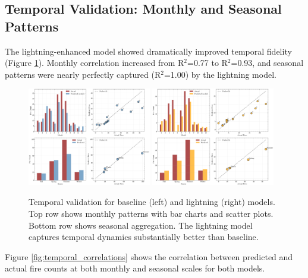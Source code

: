 \documentclass[11pt,a4paper]{article}
\begin{document}
\subsection{Temporal Validation: Monthly and Seasonal Patterns}

The lightning-enhanced model showed dramatically improved temporal fidelity (Figure \ref{fig:temporal_validation}). Monthly correlation increased from R$^2$=0.77 to R$^2$=0.93, and seasonal patterns were nearly perfectly captured (R$^2$=1.00) by the lightning model.

\begin{figure}[H]
\centering
\includegraphics[width=0.48\textwidth]{../output/figures/validation_temporal_baseline.png}
\hfill
\includegraphics[width=0.48\textwidth]{../output/figures/validation_temporal_lightning.png}
\caption{Temporal validation for baseline (left) and lightning (right) models. Top row shows monthly patterns with bar charts and scatter plots. Bottom row shows seasonal aggregation. The lightning model captures temporal dynamics substantially better than baseline.}
\label{fig:temporal_validation}
\end{figure}

Figure \ref{fig:temporal_correlations} shows the correlation between predicted and actual fire counts at both monthly and seasonal scales for both models.
\end{document}
